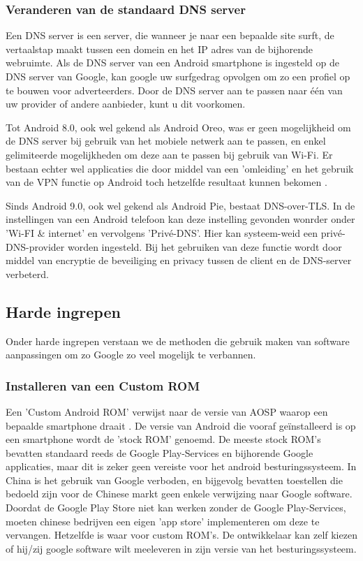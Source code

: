 \subsubsection{Veranderen van de standaard DNS server}
Een DNS server is een server, die wanneer je naar een bepaalde site surft, de vertaalstap maakt tussen een domein en het IP adres van de bijhorende webruimte. Als de DNS server van een Android smartphone is ingesteld op de DNS server van Google, kan google uw surfgedrag opvolgen om zo een profiel op te bouwen voor adverteerders. Door de DNS server aan te passen naar één van uw provider of andere aanbieder, kunt u dit voorkomen.

Tot Android 8.0, ook wel gekend als Android Oreo, was er geen mogelijkheid om de DNS server bij gebruik van het mobiele netwerk aan te passen, en enkel gelimiteerde mogelijkheden om deze aan te passen bij gebruik van Wi-Fi. Er bestaan echter wel applicaties die door middel van een 'omleiding' en het gebruik van de VPN functie op Android toch hetzelfde resultaat kunnen bekomen \autocite{knight_degoogle}. 

Sinds Android 9.0, ook wel gekend als Android Pie, bestaat DNS-over-TLS. In de instellingen van een Android telefoon kan deze instelling gevonden wonrder onder 'Wi-FI \& internet' en vervolgens 'Privé-DNS'. Hier kan systeem-weid een privé-DNS-provider worden ingesteld. Bij het gebruiken van deze functie wordt door middel van encryptie de beveiliging en privacy tussen de client en de DNS-server verbeterd. \autocite{google_dns-tls}

\subsection{Harde ingrepen}

Onder harde ingrepen verstaan we de methoden die gebruik maken van software aanpassingen om zo Google zo veel mogelijk te verbannen.

\subsubsection{Installeren van een Custom ROM}
Een 'Custom Android ROM' verwijst naar de versie van AOSP waarop een bepaalde smartphone draait \autocite{custom-rom}. De versie van Android die vooraf geïnstalleerd is op een smartphone wordt de 'stock ROM' genoemd. De meeste stock ROM's bevatten standaard reeds de Google Play-Services en bijhorende Google applicaties, maar dit is zeker geen vereiste voor het android besturingssysteem. In China is het gebruik van Google verboden, en bijgevolg bevatten toestellen die bedoeld zijn voor de Chinese markt geen enkele verwijzing naar Google software. Doordat de Google Play Store niet kan werken zonder de Google Play-Services, moeten chinese bedrijven een eigen 'app store' implementeren om deze te vervangen. Hetzelfde is waar voor custom ROM's. De ontwikkelaar kan zelf kiezen of hij/zij google software wilt meeleveren in zijn versie van het besturingssysteem.

